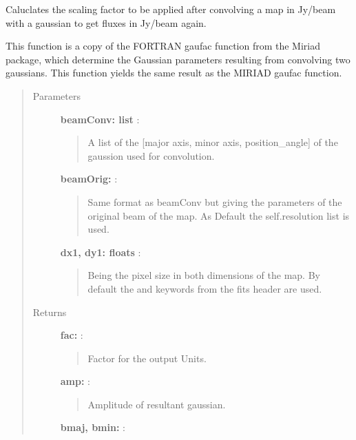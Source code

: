 \documentclass[a4paper,10pt,english]{sphinxmanual}
\begin{document}
\begin{fulllineitems}
\begin{fulllineitems}
\end{fulllineitems}


\begin{fulllineitems}
\label{maps:astrolyze.maps.fits.FitsMap.gauss_factor}
Caluclates the scaling factor to be applied after convolving
a map in Jy/beam with a gaussian to get fluxes in Jy/beam again.

This function is a copy of the FORTRAN gaufac function from the Miriad
package, which determine the Gaussian parameters resulting from
convolving two gaussians. This function yields the same result as
the MIRIAD gaufac function.
\begin{quote}\begin{description}
\item[{Parameters }] \leavevmode
\textbf{beamConv: list} :
\begin{quote}

A list of the {[}major axis, minor axis, position\_angle{]}
of the gaussion used for convolution.
\end{quote}

\textbf{beamOrig:} :
\begin{quote}

Same format as beamConv but giving the parameters of the original
beam of the map. As Default the self.resolution list is used.
\end{quote}

\textbf{dx1, dy1: floats} :
\begin{quote}

Being the pixel size in both dimensions of the map.
By default the  and  keywords from the
fits header are used.
\end{quote}

\item[{Returns }] \leavevmode
\textbf{fac:} :
\begin{quote}

Factor for the output Units.
\end{quote}

\textbf{amp:} :
\begin{quote}

Amplitude of resultant gaussian.
\end{quote}

\textbf{bmaj, bmin:} :
\begin{quote}


\end{quote}
\end{description}
\end{quote}
\end{fulllineitems}
\end{fulllineitems}
\end{document}
